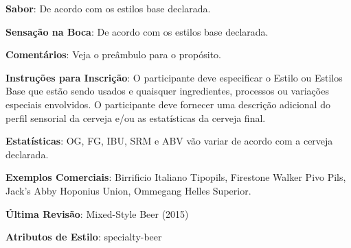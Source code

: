 \textbf{Sabor}: De acordo com os estilos base declarada.

\textbf{Sensação na Boca}: De acordo com os estilos base declarada.

\textbf{Comentários}: Veja o preâmbulo para o propósito.

\textbf{Instruções para Inscrição}: O participante deve especificar o Estilo ou Estilos Base que estão sendo usados e quaisquer ingredientes, processos ou variações especiais envolvidos. O participante deve fornecer uma descrição adicional do perfil sensorial da cerveja e/ou as estatísticas da cerveja final.

\textbf{Estatísticas}: OG, FG, IBU, SRM e ABV vão variar de acordo com a cerveja declarada.

\textbf{Exemplos Comerciais}: Birrificio Italiano Tipopils, Firestone Walker Pivo Pils, Jack’s Abby Hoponius Union, Ommegang Helles Superior.

\textbf{Última Revisão}: Mixed-Style Beer (2015)

\textbf{Atributos de Estilo}: specialty-beer
